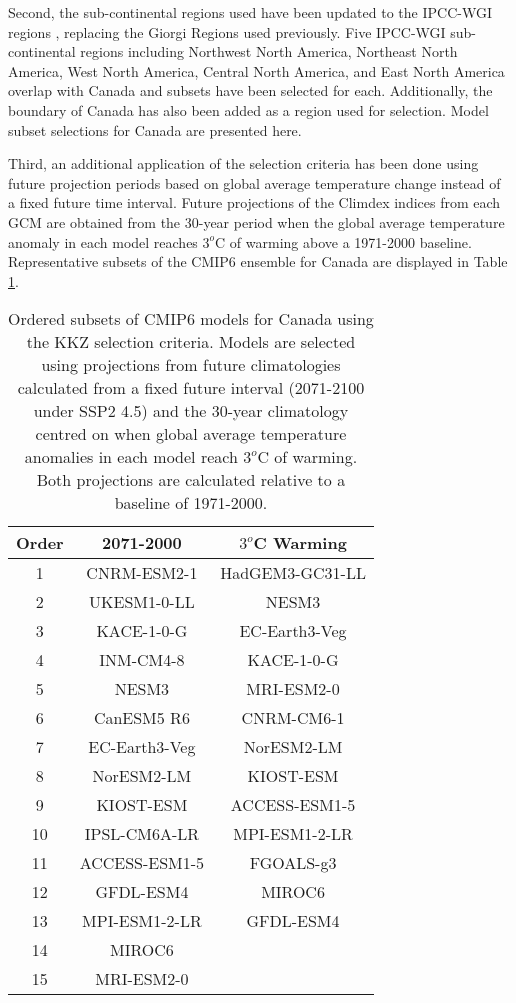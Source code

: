 \documentclass[]{scrartcl}
\begin{document}
Second, the sub-continental regions used have been updated to the IPCC-WGI regions \citep{Iturbide2020}, replacing the Giorgi Regions used previously. Five IPCC-WGI sub-continental regions including Northwest North America, Northeast North America, West North America, Central North America, and East North America overlap with Canada and subsets have been selected for each. Additionally, the boundary of Canada has also been added as a region used for selection. Model subset selections for Canada are presented here.

Third, an additional application of the selection criteria has been done using future projection periods based on global average temperature change instead of a fixed future time interval. Future projections of the Climdex indices from each GCM are obtained from the 30-year period when the global average temperature anomaly in each model reaches $3^o$C of warming above a 1971-2000 baseline. Representative subsets of the CMIP6 ensemble for Canada are displayed in Table \ref{table:can_subsets}. 


\begin{table}[ht!]
	\caption{Ordered subsets of CMIP6 models for Canada using the KKZ selection criteria. Models are selected using projections from future climatologies calculated from a fixed future interval (2071-2100 under SSP2 4.5) and the 30-year climatology centred on when global average temperature anomalies in each model reach $3^o$C of warming. Both projections are calculated relative to a baseline of 1971-2000. }\label{table:can_subsets}
	\begin{center}
		\begin{tabularx}{0.602\linewidth}{|c|c|c|}
			\hline
			\textbf{Order} & 2071-2000 & $3^o$C Warming \\
			\hline
			1 & CNRM-ESM2-1 & HadGEM3-GC31-LL \\
			2 & UKESM1-0-LL & NESM3 \\
			3 & KACE-1-0-G  & EC-Earth3-Veg \\
			4 & INM-CM4-8  & KACE-1-0-G \\
			5 & NESM3  & MRI-ESM2-0 \\
			6 & CanESM5 R6  & CNRM-CM6-1 \\
			7 & EC-Earth3-Veg  & NorESM2-LM \\
			8 & NorESM2-LM  & KIOST-ESM \\
			9 & KIOST-ESM  & ACCESS-ESM1-5 \\
			10 & IPSL-CM6A-LR  & MPI-ESM1-2-LR \\
			11 & ACCESS-ESM1-5 & FGOALS-g3 \\
			12 & GFDL-ESM4  & MIROC6 \\
			13 & MPI-ESM1-2-LR  & GFDL-ESM4 \\
			14 & MIROC6  &  \\
			15 & MRI-ESM2-0 &  \\
			\hline
		\end{tabularx}
	\end{center}
\end{table}	
\end{document}
